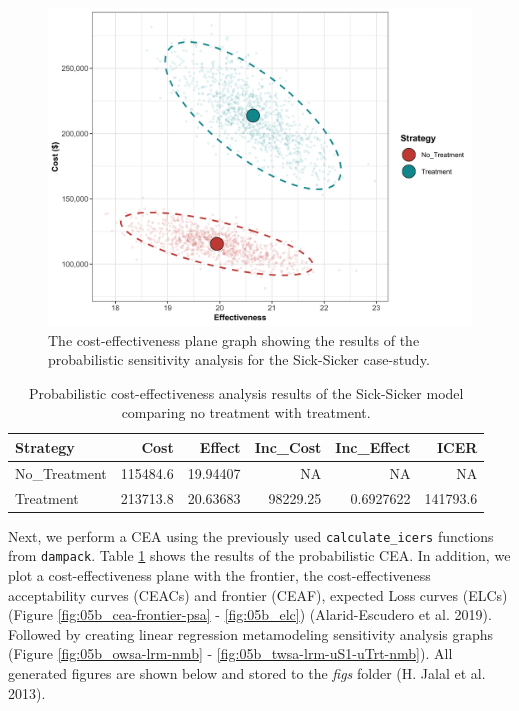 \documentclass[]{article}
\begin{document}
\begin{figure}
\centering
\includegraphics{../figs/05b_cea-plane-scatter.png}
\caption{The cost-effectiveness plane graph showing the results of the
probabilistic sensitivity analysis for the Sick-Sicker case-study.
\label{fig:05b_CEAplane}}
\end{figure}

\begin{table}[t]

\caption{\label{tab:unnamed-chunk-21}Probabilistic cost-effectiveness analysis results of the Sick-Sicker model comparing no treatment with treatment. \label{tab:df.cea.prob}}
\centering
\begin{tabular}{l|r|r|r|r|r}
\hline
Strategy & Cost & Effect & Inc\_Cost & Inc\_Effect & ICER\\
\hline
No\_Treatment & 115484.6 & 19.94407 & NA & NA & NA\\
\hline
Treatment & 213713.8 & 20.63683 & 98229.25 & 0.6927622 & 141793.6\\
\hline
\end{tabular}
\end{table}

Next, we perform a CEA using the previously used
\texttt{calculate\_icers} functions from \texttt{dampack}. Table
\ref{tab:df.cea.prob} shows the results of the probabilistic CEA. In
addition, we plot a cost-effectiveness plane with the frontier, the
cost-effectiveness acceptability curves (CEACs) and frontier (CEAF),
expected Loss curves (ELCs) (Figure \ref{fig:05b_cea-frontier-psa} -
\ref{fig:05b_elc}) (Alarid-Escudero et al. 2019). Followed by creating
linear regression metamodeling sensitivity analysis graphs (Figure
\ref{fig:05b_owsa-lrm-nmb} - \ref{fig:05b_twsa-lrm-uS1-uTrt-nmb}). All
generated figures are shown below and stored to the \emph{figs} folder
(H. Jalal et al. 2013).
\end{document}
